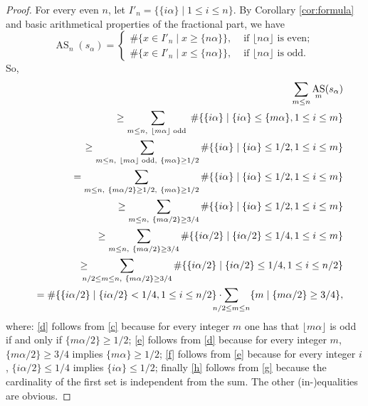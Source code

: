\documentclass[11pt,reqno]{amsart}
\numberwithin{equation}{section}
\theoremstyle{plain}
\theoremstyle{definition}
\theoremstyle{remark}
\DeclareMathOperator{\AS}{AS}
\newcommand{\ass}[2]{\AS_{#2}(#1)}
\begin{document}
\begin{proof}
For every even $n$, let $I'_{n}=\{\{i \alpha\}\mid 1\le i \le n\}$. By Corollary \ref{cor:formula} and basic arithmetical properties of the fractional part, we have
\[
\ass{s_{\alpha}} {n} = 
\begin{cases}
 \# \{x\in I'_{n} \mid x \geq \{n \alpha\}\}, & \text{ if $\lfloor n \alpha \rfloor$ is even; }\\
 \# \{x\in I'_{n} \mid x \leq \{n \alpha\}\}, & \text{ if $\lfloor n \alpha \rfloor$ is odd. }
\end{cases}
\]
So,
\begin{eqnarray}
&& \sum_{m\leq n}\ass{s_{\alpha}} {m}   \label{a}\\
%
&& \geq  \sum_{m\leq n,\ \lfloor m\alpha\rfloor \text{ odd }} \# \{ \{i \alpha\}\mid\{i \alpha\}\leq \{m \alpha\}, 1\leq i\leq m\} \label{b}\\
%
&& \geq \sum_{m\leq n,\ \lfloor m\alpha\rfloor \text{ odd},\ \{m \alpha\}\geq 1/2} \# \{ \{i \alpha\}\mid\{i \alpha\}\leq 1/2, 1\leq i\leq m\} \label{c}\\
%
&& = \sum_{m\leq n,\ \{m \alpha/2\}\geq 1/2,\ \{m \alpha\}\geq 1/2} \# \{ \{i \alpha\}\mid\{i \alpha\}\leq 1/2, 1\leq i\leq m\} \label{d}\\
%
&& \geq \sum_{m\leq n,\ \{m \alpha/2\}\geq 3/4} \# \{ \{i \alpha\}\mid\{i \alpha\}\leq 1/2, 1\leq i\leq m\} \label{e}\\
%
&& \geq \sum_{m\leq n,\ \{m \alpha/2\}\geq 3/4} \# \{ \{i \alpha/2\}\mid\{i \alpha/2\}\leq 1/4, 1\leq i\leq m\}   \label{f} \\
%
 && \geq \hspace{-3mm} \sum_{n/2\leq m\leq n,\ \{m \alpha/2\}\geq 3/4} \# \{ \{i \alpha/2\}\mid\{i \alpha/2\}\leq 1/4, 1\leq i\leq n/2 \} \label{g} \\
%
\label{1}
&& = \# \{ \{i \alpha/2\}\mid\{i \alpha/2\}<1/4, 1\leq i\leq n/2\}\cdot \hspace{-4mm} \sum_{n/2\leq m\leq n}  \{ m \mid \{m \alpha/2\}\geq 3/4 \}, \label{h}
\end{eqnarray}
where: %
\eqref{d} follows from \eqref{c} because for every integer $m$ one has that $\lfloor m\alpha\rfloor$ is odd if and only if $\{m \alpha/2\}\geq 1/2$; 
\eqref{e} follows from \eqref{d}  because for every integer $m$,
$\{m \alpha/2\}\geq 3/4$ implies $\{m \alpha\}\geq 1/2$;  
\eqref{f} follows from \eqref{e}  because for every integer $i$,
$\{i \alpha/2\}\leq 1/4$ implies $\{i \alpha\}\leq 1/2$;  
finally \eqref{h} follows from \eqref{g} because the cardinality of the first set is independent from the sum. The other (in-)equalities are obvious.


\end{proof}
\end{document}
